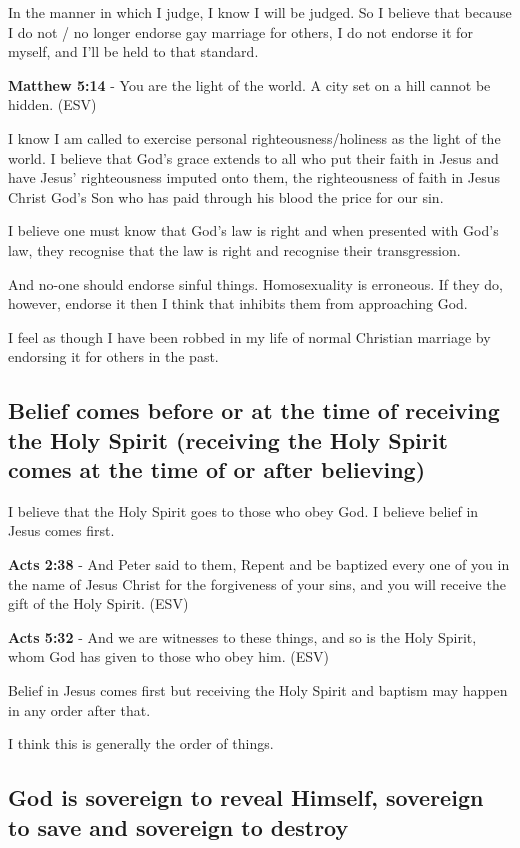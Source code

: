 \documentclass[11pt]{article}
\begin{document}
In the manner in which I judge, I know I will be judged. So I believe that because I do not / no longer endorse gay marriage for others, I do not endorse it for myself, and I'll be held to that standard.

\textbf{Matthew 5:14} - You are the light of the world.  A city set on a hill cannot be hidden.  (ESV)

I know I am called to exercise personal righteousness/holiness as the light of the world. I believe that God's grace extends to all who put their faith in Jesus and have Jesus' righteousness imputed onto them, the righteousness of faith in Jesus Christ God's Son who has paid through his blood the price for our sin.

I believe one must know that God's law is right and when presented with God's law, they recognise that the law is right and recognise their transgression.

And no-one should endorse sinful things. Homosexuality is erroneous.
If they do, however, endorse it then I think that inhibits them from approaching God.

I feel as though I have been robbed in my life of normal Christian marriage by endorsing it for others in the past.

\subsection{Belief comes before or at the time of receiving the Holy Spirit (receiving the Holy Spirit comes at the time of or after believing)}
\label{sec:org63b74d5}
I believe that the Holy Spirit goes to those who obey God. I believe belief in Jesus comes first.

\textbf{Acts 2:38} - And Peter said to them, Repent and be baptized every one of you in the name of Jesus Christ for the forgiveness of your sins, and you will receive the gift of the Holy Spirit. (ESV)

\textbf{Acts 5:32} - And we are witnesses to these things, and so is the Holy Spirit, whom God has given to those who obey him. (ESV)

Belief in Jesus comes first but receiving the Holy Spirit and baptism may happen in any order after that.

I think this is generally the order of things.

\subsection{God is sovereign to reveal Himself, sovereign to save and sovereign to destroy}
\label{sec:org33b8eae}
\end{document}
